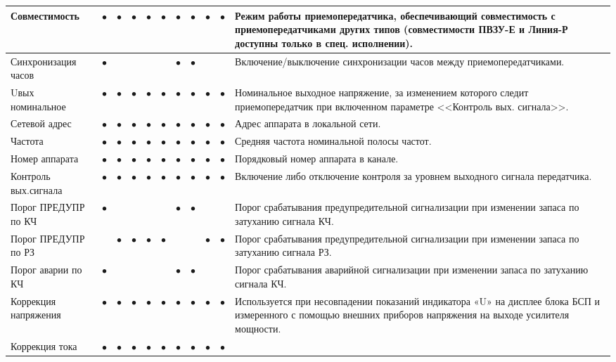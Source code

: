\begin{tabularx}{\linewidth}{| M{4.6cm} |*{9}{p{0.3cm} |} m{5.8cm} |}
	Совместимость		& $\bullet$ & $\bullet$ & $\bullet$ & $\bullet$	& $\bullet$ & $\bullet$	& $\bullet$ & $\bullet$ & $\bullet$ & 
	Режим работы приемопередатчика, обеспечивающий совместимость с приемопередатчиками других типов (совместимости ПВЗУ-Е и Линия-Р доступны только в спец. исполнении). \tabularnewline \hline
	Синхронизация часов	& $\bullet$ &   		&   		&   		&   		& $\bullet$ & $\bullet$ &   		&   		& 
	Включение/выключение синхронизации часов между приемопередатчиками. \tabularnewline \hline
	Uвых номинальное	& $\bullet$ & $\bullet$ & $\bullet$ & $\bullet$ & $\bullet$ & $\bullet$ & $\bullet$ & $\bullet$ & $\bullet$ & 
	Номинальное выходное напряжение, за изменением которого следит приемопередатчик при включенном параметре <<Контроль вых. сигнала>>.  \tabularnewline \hline
	Сетевой адрес		& $\bullet$ & $\bullet$ & $\bullet$ & $\bullet$ & $\bullet$ & $\bullet$ & $\bullet$ & $\bullet$ & $\bullet$ & 
	Адрес аппарата в локальной сети.  \tabularnewline \hline
	Частота				& $\bullet$ & $\bullet$ & $\bullet$ & $\bullet$ & $\bullet$ & $\bullet$ & $\bullet$ & $\bullet$ & $\bullet$ & 
	Средняя частота номинальной полосы частот. \tabularnewline \hline
	Номер аппарата		& $\bullet$ & $\bullet$ & $\bullet$ & $\bullet$ & $\bullet$ & $\bullet$ & $\bullet$ & $\bullet$ & $\bullet$ & 
	Порядковый номер аппарата в канале.  \tabularnewline \hline
	Контроль вых.сигнала & $\bullet$ & $\bullet$ & $\bullet$ & $\bullet$ & $\bullet$ & $\bullet$ & $\bullet$ & $\bullet$ & $\bullet$ & 
	Включение либо отключение контроля за уровнем выходного сигнала передатчика.  \tabularnewline \hline
	Порог ПРЕДУПР по КЧ & $\bullet$ &   		&   		&   		&   		& $\bullet$ & $\bullet$ &   		&   		& 
	Порог срабатывания предупредительной сигнализации при изменении запаса по затуханию сигнала КЧ.  \tabularnewline \hline
	Порог ПРЕДУПР по РЗ &   		& $\bullet$ & $\bullet$ & $\bullet$ & $\bullet$ &   		&   		& $\bullet$ & $\bullet$ & 
	Порог срабатывания предупредительной сигнализации при изменении запаса по затуханию сигнала РЗ.  \tabularnewline \hline
	Порог аварии по КЧ	& $\bullet$ &   		&   		&   		&   		& $\bullet$ & $\bullet$ &   		&   		& 
	Порог срабатывания аварийной сигнализации при изменении запаса по затуханию сигнала КЧ. \tabularnewline \hline
	Коррекция напряжения & $\bullet$ & $\bullet$ & $\bullet$ & $\bullet$ & $\bullet$ & $\bullet$ & $\bullet$ & $\bullet$ & $\bullet$ & 
	Используется при несовпадении показаний индикатора «U» на дисплее блока БСП и измеренного с помощью внешних приборов напряжения на выходе усилителя мощности. \tabularnewline \hline
	Коррекция тока 		& $\bullet$ & $\bullet$ & $\bullet$ & $\bullet$ & $\bullet$ & $\bullet$ & $\bullet$ & $\bullet$ & $\bullet$ & 

\end{tabularx}
